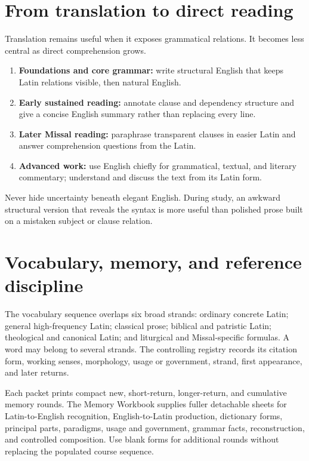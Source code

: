 \chapter{From translation to direct reading}

Translation remains useful when it exposes grammatical relations. It becomes
less central as direct comprehension grows.

\begin{enumerate}
  \item \textbf{Foundations and core grammar:} write structural English that
        keeps Latin relations visible, then natural English.
  \item \textbf{Early sustained reading:} annotate clause and dependency
        structure and give a concise English summary rather than replacing
        every line.
  \item \textbf{Later Missal reading:} paraphrase transparent clauses in
        easier Latin and answer comprehension questions from the Latin.
  \item \textbf{Advanced work:} use English chiefly for grammatical, textual,
        and literary commentary; understand and discuss the text from its
        Latin form.
\end{enumerate}

Never hide uncertainty beneath elegant English. During study, an awkward
structural version that reveals the syntax is more useful than polished prose
built on a mistaken subject or clause relation.

\chapter{Vocabulary, memory, and reference discipline}

The vocabulary sequence overlaps six broad strands: ordinary concrete Latin;
general high-frequency Latin; classical prose; biblical and patristic Latin;
theological and canonical Latin; and liturgical and Missal-specific formulas.
A word may belong to several strands. The controlling registry records its
citation form, working senses, morphology, usage or government, strand, first
appearance, and later returns.

Each packet prints compact new, short-return, longer-return, and cumulative
memory rounds. The Memory Workbook supplies fuller detachable sheets for
Latin-to-English recognition, English-to-Latin production, dictionary forms,
principal parts, paradigms, usage and government, grammar facts,
reconstruction, and controlled composition. Use blank forms for
additional rounds without replacing the populated course sequence.

